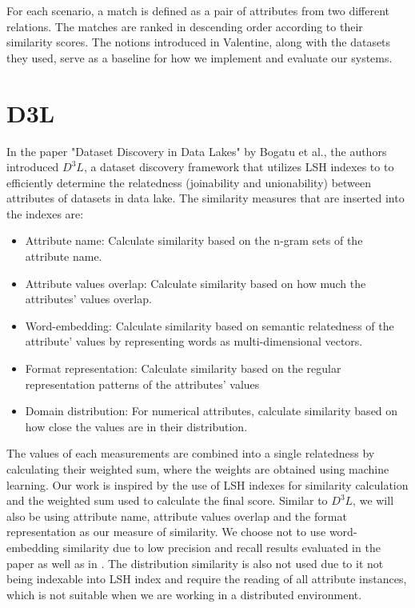 For each scenario, a match is defined as a pair of attributes from two different relations. The matches are ranked in descending order according to their similarity scores. The notions introduced in Valentine, along with the datasets they used, serve as a baseline for how we implement and evaluate our systems.

\section{D3L}

In the paper "Dataset Discovery in Data Lakes" by Bogatu et al., the authors introduced  \(D^3L\), a dataset discovery framework that utilizes LSH indexes to to efficiently determine the relatedness (joinability and unionability) between attributes of datasets in data lake. The similarity measures that are inserted into the indexes are:

\begin{itemize}
    \item Attribute name: Calculate similarity based on the n-gram sets of the attribute name.
    \item Attribute values overlap: Calculate similarity based on how much the attributes' values overlap.
    \item Word-embedding: Calculate similarity based on semantic relatedness of the attribute' values by representing words as multi-dimensional vectors.
    \item Format representation: Calculate similarity based on the regular representation patterns of the attributes' values
    \item Domain distribution: For numerical attributes, calculate similarity based on how close the values are in their distribution.
\end{itemize}

The values of each measurements are combined into a single relatedness by calculating their weighted sum, where the weights are obtained using machine learning. Our work is inspired by the use of LSH indexes for similarity calculation and the weighted sum used to calculate the final score. Similar to \(D^3L\), we will also be using attribute name, attribute values overlap and the format representation as our measure of similarity. We choose not to use word-embedding similarity due to low precision and recall results evaluated in the paper as well as in \cite{valentine}. The distribution similarity is also not used due to it not being indexable into LSH index and require the reading of all attribute instances, which is not suitable when we are working in a distributed environment. 

